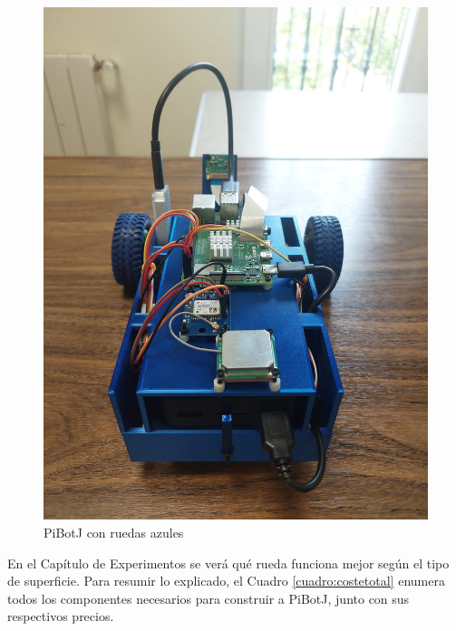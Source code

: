 \begin{figure} [h!]
	\begin{center}
		\includegraphics[width=12cm]{figs/cap5/ra.jpeg}
	\end{center}
	\caption{PiBotJ con ruedas azules} 
	\label{fig:ra}
\end{figure}

En el Capítulo de Experimentos se verá qué rueda funciona mejor según el tipo de superficie. Para resumir lo explicado, el Cuadro \ref{cuadro:costetotal} enumera todos los componentes necesarios para construir a PiBotJ, junto con sus respectivos precios.

